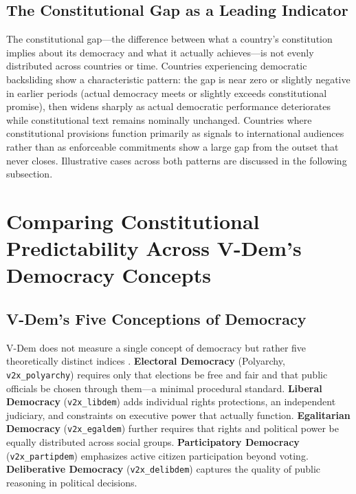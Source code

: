 \documentclass[9pt,twoside]{pnas-new}
\begin{document}
\subsection*{The Constitutional Gap as a Leading Indicator}

The constitutional gap---the difference between what a country's constitution implies about its democracy and what it actually achieves---is not evenly distributed across countries or time. Countries experiencing democratic backsliding show a characteristic pattern: the gap is near zero or slightly negative in earlier periods (actual democracy meets or slightly exceeds constitutional promise), then widens sharply as actual democratic performance deteriorates while constitutional text remains nominally unchanged. Countries where constitutional provisions function primarily as signals to international audiences rather than as enforceable commitments show a large gap from the outset that never closes. Illustrative cases across both patterns are discussed in the following subsection.

\section*{Comparing Constitutional Predictability Across V-Dem's Democracy Concepts}

\subsection*{V-Dem's Five Conceptions of Democracy}

V-Dem does not measure a single concept of democracy but rather five theoretically distinct indices \cite{coppedge_vdem_2024}. \textbf{Electoral Democracy} (Polyarchy, \texttt{v2x\_polyarchy}) requires only that elections be free and fair and that public officials be chosen through them---a minimal procedural standard. \textbf{Liberal Democracy} (\texttt{v2x\_libdem}) adds individual rights protections, an independent judiciary, and constraints on executive power that actually function. \textbf{Egalitarian Democracy} (\texttt{v2x\_egaldem}) further requires that rights and political power be equally distributed across social groups. \textbf{Participatory Democracy} (\texttt{v2x\_partipdem}) emphasizes active citizen participation beyond voting. \textbf{Deliberative Democracy} (\texttt{v2x\_delibdem}) captures the quality of public reasoning in political decisions.
\end{document}
